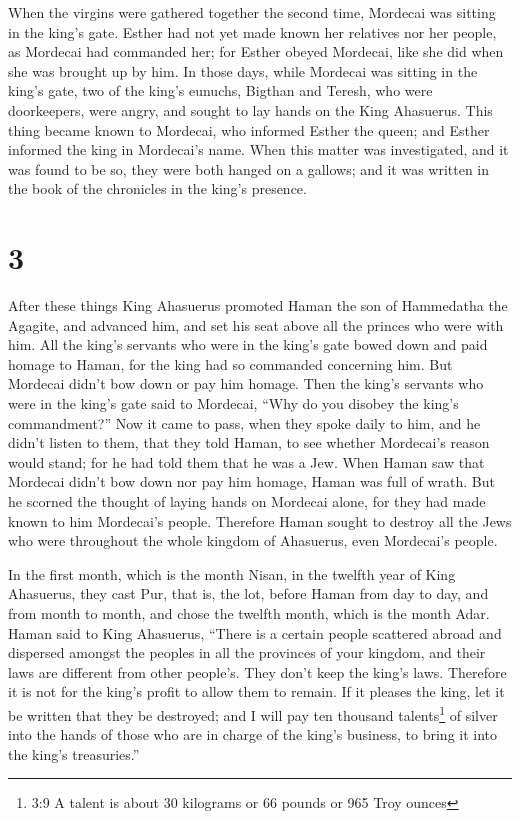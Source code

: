  When the virgins were gathered together the second time,
Mordecai was sitting in the king's gate.  Esther had not
yet made known her relatives nor her people, as Mordecai had commanded
her; for Esther obeyed Mordecai, like she did when she was brought up by
him.  In those days, while Mordecai was sitting in the
king's gate, two of the king's eunuchs, Bigthan and Teresh, who were
doorkeepers, were angry, and sought to lay hands on the King Ahasuerus.
 This thing became known to Mordecai, who informed Esther
the queen; and Esther informed the king in Mordecai's name.
 When this matter was investigated, and it was found to be
so, they were both hanged on a gallows; and it was written in the book
of the chronicles in the king's presence.

\hypertarget{section-2}{%
\section{3}\label{section-2}}

 After these things King Ahasuerus promoted Haman the son of
Hammedatha the Agagite, and advanced him, and set his seat above all the
princes who were with him.  All the king's servants who were
in the king's gate bowed down and paid homage to Haman, for the king had
so commanded concerning him. But Mordecai didn't bow down or pay him
homage.  Then the king's servants who were in the king's
gate said to Mordecai, ``Why do you disobey the king's commandment?''
 Now it came to pass, when they spoke daily to him, and he
didn't listen to them, that they told Haman, to see whether Mordecai's
reason would stand; for he had told them that he was a Jew. 
When Haman saw that Mordecai didn't bow down nor pay him homage, Haman
was full of wrath.  But he scorned the thought of laying
hands on Mordecai alone, for they had made known to him Mordecai's
people. Therefore Haman sought to destroy all the Jews who were
throughout the whole kingdom of Ahasuerus, even Mordecai's people.

 In the first month, which is the month Nisan, in the
twelfth year of King Ahasuerus, they cast Pur, that is, the lot, before
Haman from day to day, and from month to month, and chose the twelfth
month, which is the month Adar.  Haman said to King
Ahasuerus, ``There is a certain people scattered abroad and dispersed
amongst the peoples in all the provinces of your kingdom, and their laws
are different from other people's. They don't keep the king's laws.
Therefore it is not for the king's profit to allow them to remain.
 If it pleases the king, let it be written that they be
destroyed; and I will pay ten thousand talents\footnote{3:9 A talent is
  about 30 kilograms or 66 pounds or 965 Troy ounces} of silver into the
hands of those who are in charge of the king's business, to bring it
into the king's treasuries.''

